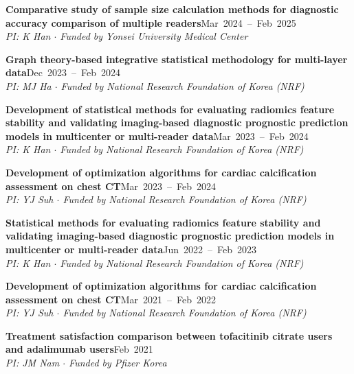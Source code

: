 \documentclass[10pt,a4paper]{article}
\newenvironment{projlist}{%
    \renewcommand{\labelenumi}{\color{headercolor}[\theenumi]}%
    \begin{etaremune}[leftmargin=2em, itemsep=0.3em]%
}{\end{etaremune}}
\begin{document}
\begin{projlist}
    \item \textbf{Comparative study of sample size calculation methods for diagnostic accuracy comparison of multiple readers}\hfill{}\hspace*{\fill}\mbox{Mar 2024 -- Feb 2025}\\
    \textit{PI: K Han $\cdot$ Funded by Yonsei University Medical Center}

    \item \textbf{Graph theory-based integrative statistical methodology for multi-layer data}\hfill{}\hspace*{\fill}\mbox{Dec 2023 -- Feb 2024}\\
    \textit{PI: MJ Ha $\cdot$ Funded by National Research Foundation of Korea (NRF)}

    \item \textbf{Development of statistical methods for evaluating radiomics feature stability and validating imaging-based diagnostic prognostic prediction models in multicenter or multi-reader data}\hfill{}\hspace*{\fill}\mbox{Mar 2023 -- Feb 2024}\\
    \textit{PI: K Han $\cdot$ Funded by National Research Foundation of Korea (NRF)}

    \item \textbf{Development of optimization algorithms for cardiac calcification assessment on chest CT}\hfill{}\hspace*{\fill}\mbox{Mar 2023 -- Feb 2024}\\
    \textit{PI: YJ Suh $\cdot$ Funded by National Research Foundation of Korea (NRF)}

    \item \textbf{Statistical methods for evaluating radiomics feature stability and validating imaging-based diagnostic prognostic prediction models in multicenter or multi-reader data}\hfill{}\hspace*{\fill}\mbox{Jun 2022 -- Feb 2023}\\
    \textit{PI: K Han $\cdot$ Funded by National Research Foundation of Korea (NRF)}

    \item \textbf{Development of optimization algorithms for cardiac calcification assessment on chest CT}\hfill{}\hspace*{\fill}\mbox{Mar 2021 -- Feb 2022}\\
    \textit{PI: YJ Suh $\cdot$ Funded by National Research Foundation of Korea (NRF)}

    \item \textbf{Treatment satisfaction comparison between tofacitinib citrate users and adalimumab users}\hfill{}\hspace*{\fill}\mbox{Feb 2021}\\
    \textit{PI: JM Nam $\cdot$ Funded by Pfizer Korea}
\end{projlist}
\end{document}
